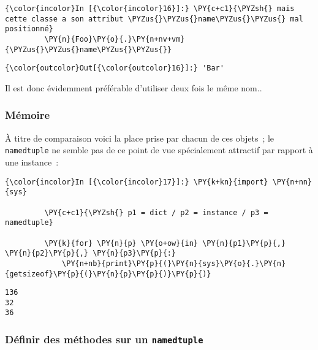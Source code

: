    \begin{Verbatim}[commandchars=\\\{\}]
{\color{incolor}In [{\color{incolor}16}]:} \PY{c+c1}{\PYZsh{} mais cette classe a son attribut \PYZus{}\PYZus{}name\PYZus{}\PYZus{} mal positionné}
         \PY{n}{Foo}\PY{o}{.}\PY{n+nv+vm}{\PYZus{}\PYZus{}name\PYZus{}\PYZus{}}
\end{Verbatim}


\begin{Verbatim}[commandchars=\\\{\}]
{\color{outcolor}Out[{\color{outcolor}16}]:} 'Bar'
\end{Verbatim}
            
    Il est donc évidemment préférable d'utiliser deux fois le même nom..

    \hypertarget{muxe9moire}{%
\subsubsection{Mémoire}\label{muxe9moire}}

    À titre de comparaison voici la place prise par chacun de ces objets~;
le \texttt{namedtuple} ne semble pas de ce point de vue spécialement
attractif par rapport à une instance~:

    \begin{Verbatim}[commandchars=\\\{\}]
{\color{incolor}In [{\color{incolor}17}]:} \PY{k+kn}{import} \PY{n+nn}{sys}
         
         \PY{c+c1}{\PYZsh{} p1 = dict / p2 = instance / p3 = namedtuple}
         
         \PY{k}{for} \PY{n}{p} \PY{o+ow}{in} \PY{n}{p1}\PY{p}{,} \PY{n}{p2}\PY{p}{,} \PY{n}{p3}\PY{p}{:}
             \PY{n+nb}{print}\PY{p}{(}\PY{n}{sys}\PY{o}{.}\PY{n}{getsizeof}\PY{p}{(}\PY{n}{p}\PY{p}{)}\PY{p}{)}
\end{Verbatim}


    \begin{Verbatim}[commandchars=\\\{\}]
136
32
36

    \end{Verbatim}

    \hypertarget{duxe9finir-des-muxe9thodes-sur-un-namedtuple}{%
\subsubsection{\texorpdfstring{Définir des méthodes sur un
\texttt{namedtuple}}{Définir des méthodes sur un namedtuple}}\label{duxe9finir-des-muxe9thodes-sur-un-namedtuple}}

